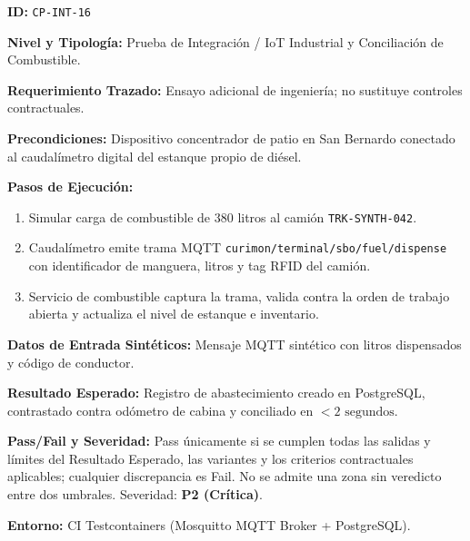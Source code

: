 \par\noindent\textbf{ID:} \texttt{C\allowbreak{}P\allowbreak{}-\allowbreak{}I\allowbreak{}N\allowbreak{}T\allowbreak{}-\allowbreak{}1\allowbreak{}6\allowbreak{}}\par
\par\noindent\textbf{Nivel y Tipología:} Prueba de Integración / IoT Industrial y Conciliación de Combustible.\par
\par\noindent\textbf{Requerimiento Trazado:} Ensayo adicional de ingeniería; no sustituye controles contractuales.\par
\par\noindent\textbf{Precondiciones:} Dispositivo concentrador de patio en San Bernardo conectado al caudalímetro digital del estanque propio de diésel.\par
\par\noindent\textbf{Pasos de Ejecución:} \par
\begin{enumerate}
\item Simular carga de combustible de 380 litros al camión \texttt{T\allowbreak{}R\allowbreak{}K\allowbreak{}-\allowbreak{}S\allowbreak{}Y\allowbreak{}N\allowbreak{}T\allowbreak{}H\allowbreak{}-\allowbreak{}0\allowbreak{}4\allowbreak{}2\allowbreak{}}.
\item Caudalímetro emite trama MQTT \texttt{c\allowbreak{}u\allowbreak{}r\allowbreak{}i\allowbreak{}m\allowbreak{}o\allowbreak{}n\allowbreak{}/\allowbreak{}t\allowbreak{}e\allowbreak{}r\allowbreak{}m\allowbreak{}i\allowbreak{}n\allowbreak{}a\allowbreak{}l\allowbreak{}/\allowbreak{}s\allowbreak{}b\allowbreak{}o\allowbreak{}/\allowbreak{}f\allowbreak{}u\allowbreak{}e\allowbreak{}l\allowbreak{}/\allowbreak{}d\allowbreak{}i\allowbreak{}s\allowbreak{}p\allowbreak{}e\allowbreak{}n\allowbreak{}s\allowbreak{}e\allowbreak{}} con identificador de manguera, litros y tag RFID del camión.
\item Servicio de combustible captura la trama, valida contra la orden de trabajo abierta y actualiza el nivel de estanque e inventario.
\end{enumerate}
\par\noindent\textbf{Datos de Entrada Sintéticos:} Mensaje MQTT sintético con litros dispensados y código de conductor.\par
\par\noindent\textbf{Resultado Esperado:} Registro de abastecimiento creado en PostgreSQL, contrastado contra odómetro de cabina y conciliado en \(< 2\text{ segundos}\).\par
\par\noindent\textbf{Pass/Fail y Severidad:} Pass únicamente si se cumplen todas las salidas y límites del Resultado Esperado, las variantes y los criterios contractuales aplicables; cualquier discrepancia es Fail. No se admite una zona sin veredicto entre dos umbrales. Severidad: \textbf{P2 (Crítica)}.\par
\par\noindent\textbf{Entorno:} CI Testcontainers (Mosquitto MQTT Broker + PostgreSQL).\par






